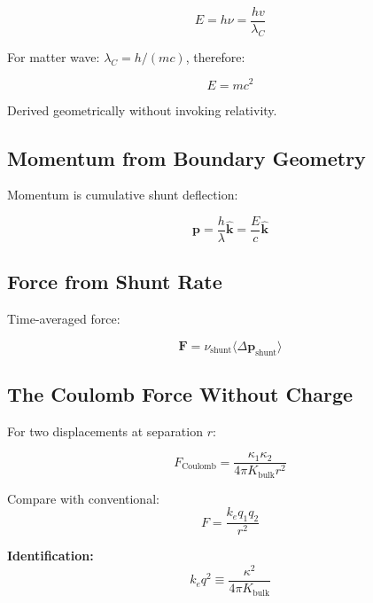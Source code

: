 \begin{equation}
E = h \nu = \frac{h v}{\lambda_C}
\end{equation}

For matter wave: $\lambda_C = h/(mc)$, therefore:

\begin{equation}
E = mc^2
\end{equation}

Derived geometrically without invoking relativity.

\subsection{Momentum from Boundary Geometry}

Momentum is cumulative shunt deflection:

\begin{equation}
\mathbf{p} = \frac{h}{\lambda} \hat{\mathbf{k}} = \frac{E}{c} \hat{\mathbf{k}}
\end{equation}

\subsection{Force from Shunt Rate}

Time-averaged force:

\begin{equation}
\mathbf{F} = \nu_{\text{shunt}} \langle \Delta \mathbf{p}_{\text{shunt}} \rangle
\end{equation}

\subsection{The Coulomb Force Without Charge}

For two displacements at separation $r$:

\begin{equation}
F_{\text{Coulomb}} = \frac{\kappa_1 \kappa_2}{4\pi K_{\text{bulk}} r^2}
\label{eq:coulomb_kappa}
\end{equation}

Compare with conventional:
\begin{equation}
F = \frac{k_e q_1 q_2}{r^2}
\end{equation}

\textbf{Identification:}
\begin{equation}
k_e q^2 \equiv \frac{\kappa^2}{4\pi K_{\text{bulk}}}
\end{equation}

